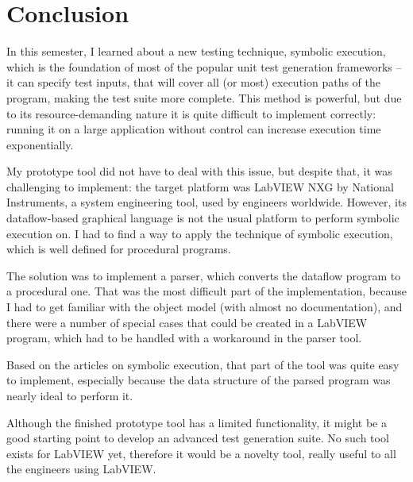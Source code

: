 \chapter{Conclusion}

In this semester, I learned about a new testing technique, symbolic execution, which is the foundation of most of the popular unit test generation frameworks -- it can specify test inputs, that will cover all (or most) execution paths of the program, making the test suite more complete. This method is powerful, but due to its resource-demanding nature it is quite difficult to implement correctly: running it on a large application without control can increase execution time exponentially. 

My prototype tool did not have to deal with this issue, but despite that, it was challenging to implement: the target platform was LabVIEW NXG by National Instruments, a system engineering tool, used by engineers worldwide. However, its dataflow-based graphical language is not the usual platform to perform symbolic execution on. I had to find a way to apply the technique of symbolic execution, which is well defined for procedural programs.

The solution was to implement a parser, which converts the dataflow program to a procedural one. That was the most difficult part of the implementation, because I had to get familiar with the object model (with almost no documentation), and there were a number of special cases that could be created in a LabVIEW program, which had to be handled with a workaround in the parser tool.

Based on the articles on symbolic execution, that part of the tool was quite easy to implement, especially because the data structure of the parsed program was nearly ideal to perform it. 

Although the finished prototype tool has a limited functionality, it might be a good starting point to develop an advanced test generation suite. No such tool exists for LabVIEW yet, therefore it would be a novelty tool, really useful to all the engineers using LabVIEW.